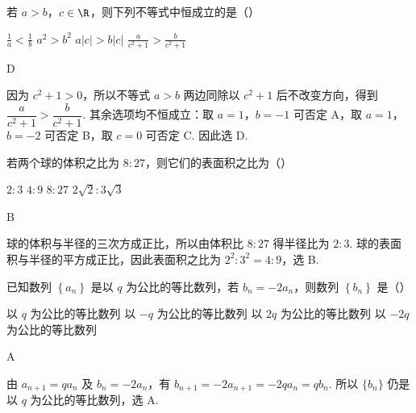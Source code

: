 \begin{problem}
若 \( a > b \)，\( c \in \R \)，则下列不等式中恒成立的是（\quad）

\choices
    {\( \frac{1}{a}<\frac{1}{b} \)}
    {\( a^{2}>b^{2} \)}
    {\( a|c|>b|c| \)}
    {\( \frac{a}{c^{2}+1}>\frac{b}{c^{2}+1} \)}
\end{problem}

\begin{answer}
D
\end{answer}

\begin{solution}
因为 \(c^2+1>0\)，所以不等式 \(a>b\) 两边同除以 \(c^2+1\) 后不改变方向，得到 \(\dfrac{a}{c^2+1}>\dfrac{b}{c^2+1}\). 其余选项均不恒成立：取 \(a=1\)，\(b=-1\) 可否定 A，取 \(a=1\)，\(b=-2\) 可否定 B，取 \(c=0\) 可否定 C. 因此选 D.
\end{solution}

\begin{problem}
若两个球的体积之比为 \(8:27\)，则它们的表面积之比为（\quad）

\choices
    {\(2:3\)}
    {\(4:9\)}
    {\(8:27\)}
    {\(2\sqrt{2}:3\sqrt{3}\)}
\end{problem}

\begin{answer}
B
\end{answer}

\begin{solution}
球的体积与半径的三次方成正比，所以由体积比 \(8:27\) 得半径比为 \(2:3\). 球的表面积与半径的平方成正比，因此表面积之比为 \(2^2:3^2=4:9\)，选 B.
\end{solution}

\begin{problem}
已知数列 \( \left\{a_{n}\right\} \) 是以 \(q\) 为公比的等比数列，若 \( b_{n}=-2a_{n} \)，则数列 \( \left\{b_{n}\right\} \) 是（\quad）

\choices
    {以 \(q\) 为公比的等比数列}
    {以 \(-q\) 为公比的等比数列}
    {以 \(2q\) 为公比的等比数列}
    {以 \(-2q\) 为公比的等比数列}
\end{problem}

\begin{answer}
A
\end{answer}

\begin{solution}
由 \(a_{n+1}=qa_n\) 及 \(b_n=-2a_n\)，有 \(b_{n+1}=-2a_{n+1}=-2qa_n=qb_n\). 所以 \(\{b_n\}\) 仍是以 \(q\) 为公比的等比数列，选 A.
\end{solution}

